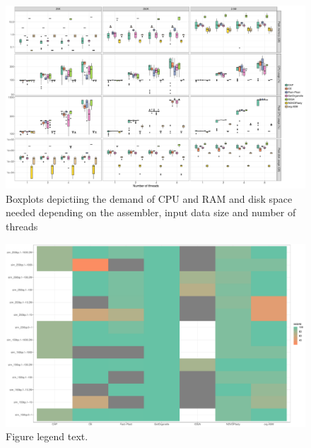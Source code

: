\documentclass{bmcart}
\begin{document}
\begin{backmatter}
\begin{figure}[h!]
  \includegraphics[width=\textwidth]{plots/usage_amount_threads.pdf}
  \caption{
      Boxplots depictiing the demand of CPU and RAM and disk space needed depending on the assembler, input data size and number of threads}
      \label{fig:performance_memory_cpu}
      \end{figure}

\begin{figure}[h!]
  \includegraphics[width=\textwidth]{plots/sim_tiles.pdf}
  \caption{
      Figure legend text.}
      \label{fig:simulated}
      \end{figure}


\end{backmatter}
\end{document}
